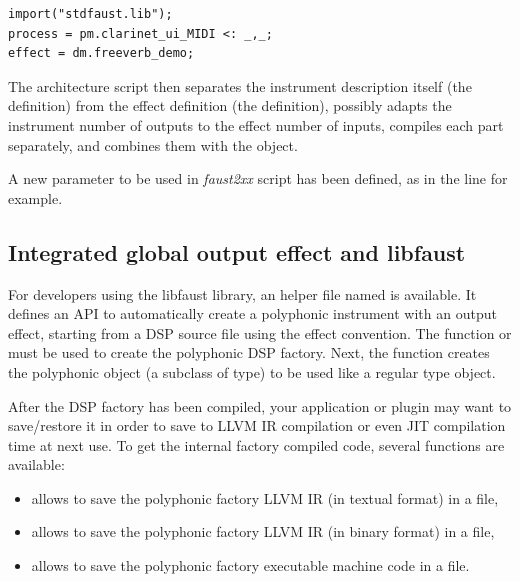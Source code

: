 \begin{lstlisting}
import("stdfaust.lib");
process = pm.clarinet_ui_MIDI <: _,_;
effect = dm.freeverb_demo;
\end{lstlisting}

The architecture script then separates the instrument description itself (the  definition) from the effect definition (the   definition), possibly adapts the instrument number of outputs to the effect number of inputs, compiles each part separately, and combines them with the  object.

A new  parameter to be used in {\it faust2xx} script has been defined, as in the  line for example.

\subsection{Integrated global output effect and libfaust}

For developers using the libfaust library, an helper file named  is available. It defines an API to automatically create a polyphonic instrument with an output effect, starting from a DSP source file using the  effect  convention. The function  or  \\  must be used to create the polyphonic DSP factory. Next, the  function creates the polyphonic object (a subclass of  type) to be used like a regular  type object. 

After the DSP factory has been compiled, your application or plugin may want to save/restore it in order to save \faust to LLVM IR compilation or even JIT compilation time at next use. To get the internal factory compiled code, several functions are available:

\begin{itemize}
\item {} allows to save the polyphonic factory LLVM IR (in textual format) in a file,
\item {} allows to save the polyphonic factory LLVM IR (in binary format) in a file,
\item {} allows to save the polyphonic factory executable machine code in a file.
\end{itemize}

